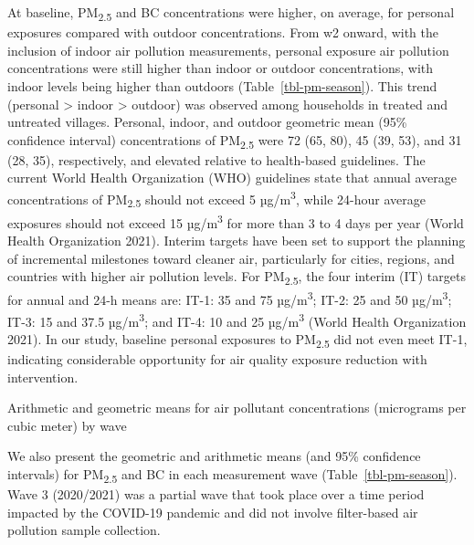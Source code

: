 \documentclass[
  letterpaper,
  DIV=11,
  numbers=noendperiod]{scrartcl}
\makeatletter
\renewenvironment{table}%
   {\renewcommand\familydefault\sfdefault
    \@float{table}}
   {\end@float}
\makeatother
\begin{document}
At baseline, PM\textsubscript{2.5} and BC concentrations were higher, on
average, for personal exposures compared with outdoor concentrations.
From w2 onward, with the inclusion of indoor air pollution measurements,
personal exposure air pollution concentrations were still higher than
indoor or outdoor concentrations, with indoor levels being higher than
outdoors (Table~\ref{tbl-pm-season}). This trend (personal
\textgreater{} indoor \textgreater{} outdoor) was observed among
households in treated and untreated villages. Personal, indoor, and
outdoor geometric mean (95\% confidence interval) concentrations of
PM\textsubscript{2.5} were 72 (65, 80), 45 (39, 53), and 31 (28, 35),
respectively, and elevated relative to health-based guidelines. The
current World Health Organization (WHO) guidelines state that annual
average concentrations of PM\textsubscript{2.5} should not exceed 5
µg/m\textsuperscript{3}, while 24-hour average exposures should not
exceed 15 µg/m\textsuperscript{3} for more than 3 to 4 days per year
(World Health Organization 2021). Interim targets have been set to
support the planning of incremental milestones toward cleaner air,
particularly for cities, regions, and countries with higher air
pollution levels. For PM\textsubscript{2.5}, the four interim (IT)
targets for annual and 24-h means are: IT-1: 35 and 75
µg/m\textsuperscript{3}; IT-2: 25 and 50 µg/m\textsuperscript{3}; IT-3:
15 and 37.5 µg/m\textsuperscript{3}; and IT-4: 10 and 25
µg/m\textsuperscript{3} (World Health Organization 2021). In our study,
baseline personal exposures to PM\textsubscript{2.5} did not even meet
IT-1, indicating considerable opportunity for air quality exposure
reduction with intervention.

\begin{table}

\caption{\label{tbl-pm-season}Arithmetic and geometric means for air
pollutant concentrations (micrograms per cubic meter) by wave}

\centering{

}

\end{table}%

We also present the geometric and arithmetic means (and 95\% confidence
intervals) for PM\textsubscript{2.5} and BC in each measurement wave
(Table~\ref{tbl-pm-season}). Wave 3 (2020/2021) was a partial wave that
took place over a time period impacted by the COVID-19 pandemic and did
not involve filter-based air pollution sample collection.
\end{document}
